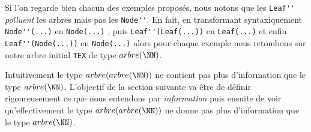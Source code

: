 Si l'on regarde bien chacun des exemples proposés, nous notons que les \verb+Leaf''+ \emph{\og polluent \fg} les arbres mais pas les \verb+Node''+.
En fait, en transformant syntaxiquement \verb+Node''(...)+ en \verb+Node(...)+ , puis  \verb+Leaf''(Leaf(...))+ en \verb+Leaf(...)+ et enfin \verb+Leaf''(Node(...))+ en \verb+Node(...)+ alors pour chaque exemple nous retombons sur notre arbre initial \verb+TEX+ de type $arbre(\NN)$.


\medskip

Intuitivement le type $arbre(arbre(\NN))$ ne contient pas plus d'information que le type $arbre(\NN)$. 
L'objectif de la section suivante va être de définir rigoureusement ce que nous entendons par \emph{\og information \fg} puis ensuite de voir qu'effectivement le type $arbre(arbre(\NN))$ ne donne pas plus d'information que le type $arbre(\NN)$.
